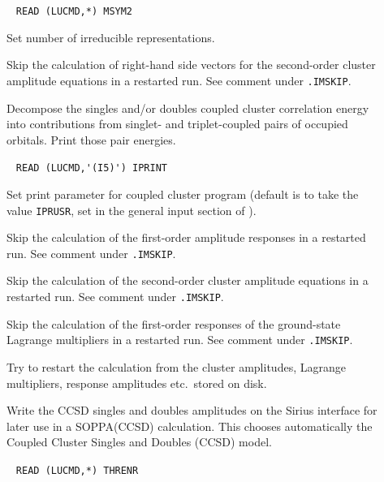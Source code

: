 \begin{description}
\item[] \verb| |\newline
       \verb|READ (LUCMD,*) MSYM2|

       Set number of irreducible representations. 
 
\item[] 
   Skip the calculation of right-hand side vectors for the 
   second-order cluster amplitude equations
   in a restarted run. See comment under \verb|.IMSKIP|.
%
%

%
%
\item[]
         Decompose the singles and/or doubles coupled cluster correlation energy
         into contributions from singlet- and triplet-coupled
         pairs of occupied orbitals. Print those pair energies.

\item[]  \verb| |\newline
\verb|READ (LUCMD,'(I5)') IPRINT|

       Set print parameter for coupled cluster program
       (default is to take the value \verb+IPRUSR+, set in the general
       input section of \dalton).
%
\item[] 
   Skip the calculation of the first-order amplitude responses
   in a restarted run. See comment under \verb|.IMSKIP|.
%
\item[] 
   Skip the calculation of the 
   second-order cluster amplitude equations
   in a restarted run. See comment under \verb|.IMSKIP|.
%
\item[] 
   Skip the calculation of the first-order responses of the 
   ground-state Lagrange multipliers in a restarted run. See comment under \verb|.IMSKIP|.
%
\item[] 
       Try to restart the calculation from the cluster amplitudes,
       Lagrange multipliers, response amplitudes etc.\ stored on
       disk.
%
\item[] 
       Write the CCSD singles and doubles amplitudes on the Sirius interface
       for later use in a SOPPA(CCSD) calculation. This
       chooses automatically the Coupled Cluster Singles and Doubles (CCSD) model.
%
\item[] \verb| |\newline
       \verb|READ (LUCMD,*) THRENR|


\end{description}
